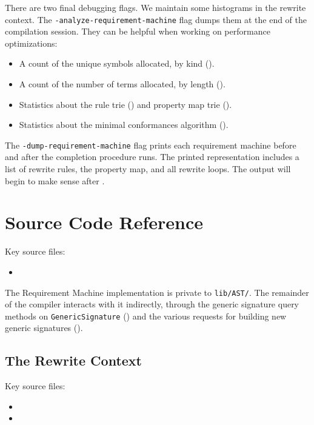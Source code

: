 \documentclass[../generics]{subfiles}
\begin{document}
There are two final debugging flags. We maintain some histograms in the rewrite context. The \texttt{-analyze-requirement-machine} flag dumps them at the end of the compilation session. They can be helpful when working on performance optimizations:
\begin{itemize}
\item A count of the unique symbols allocated, by kind ().
\item A count of the number of terms allocated, by length ().
\item Statistics about the rule trie () and property map trie ().
\item Statistics about the minimal conformances algorithm ().
\end{itemize}

The \texttt{-dump-requirement-machine} flag prints each requirement machine before and after the completion procedure runs. The printed representation includes a list of rewrite rules, the property map, and all rewrite loops. The output will begin to make sense after .

\section{Source Code Reference}\label{rqm basic operation source ref}

Key source files:
\begin{itemize}
\item {}
\end{itemize}
The Requirement Machine implementation is private to \texttt{lib/AST/}. The remainder of the compiler interacts with it indirectly, through the generic signature query methods on \texttt{GenericSignature} () and the various requests for building new generic signatures ().

\subsection*{The Rewrite Context}

Key source files:
\begin{itemize}
\item {}
\item {}
\end{itemize}
\end{document}

